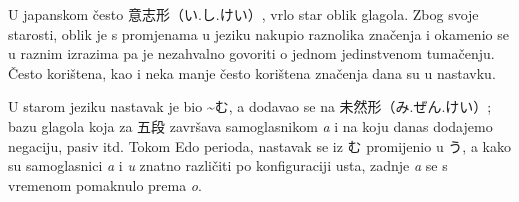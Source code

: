 
\author{Tomislav Mamić}

	\footnotemark[1]
	
	
	U japanskom često 意志形（い.し.けい）, vrlo star oblik glagola.
	Zbog svoje starosti, oblik je s promjenama u jeziku nakupio raznolika značenja i okamenio se u raznim izrazima pa je nezahvalno govoriti o jednom jedinstvenom tumačenju.
	Često korištena, kao i neka manje često korištena značenja dana su u nastavku.
	
	
	U starom jeziku nastavak je bio \textasciitilde む, a dodavao se na 未然形（み.ぜん.けい）; bazu glagola koja za 五段 završava samoglasnikom \textit{a} i na koju danas dodajemo negaciju, pasiv itd. Tokom Edo perioda, nastavak se iz む promijenio u う, a kako su samoglasnici \textit{a} i \textit{u} znatno različiti po konfiguraciji usta, zadnje \textit{a} se s vremenom pomaknulo prema \textit{o}.
	
